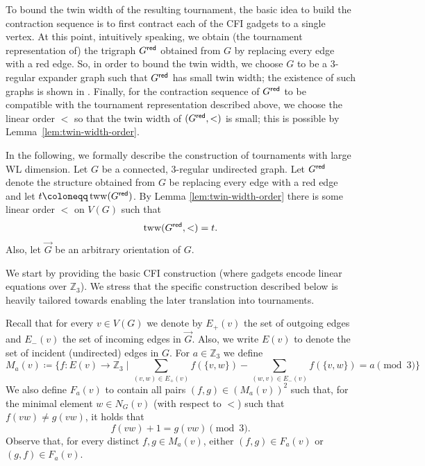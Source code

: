 \documentclass{theoretics}
\newcommand{\ZZ}{{\mathbb Z}}
\newcommand{\Bigmid}{\;\Big|\;}
\newcommand{\red}{{\sf red}}
\DeclareMathOperator{\tww}{tww}
\begin{document}
To bound the twin width of the resulting tournament, the basic idea to build the contraction sequence is to first contract each of the CFI gadgets to a single vertex.
At this point, intuitively speaking, we obtain (the tournament representation of) the trigraph $G^{\red}$ obtained from $G$ by replacing every edge with a red edge.
So, in order to bound the twin width, we choose $G$ to be a $3$-regular expander graph such that $G^{\red}$ has small twin width; the existence of such graphs is shown in \cite{BonnetGKTW22}.
Finally, for the contraction sequence of $G^{\red}$ to be compatible with the tournament representation described above, we choose the linear order $<$ so that the twin width of $(G^{\red},<)$ is small; this is possible by Lemma~\ref{lem:twin-width-order}.

In the following, we formally describe the construction of tournaments with large WL dimension.
Let $G$ be a connected, $3$-regular undirected graph.
Let $G^{\red}$ denote the structure obtained from $G$ be replacing every edge with a red edge and let $t \coloneqq \tww(G^{\red})$.
By Lemma \ref{lem:twin-width-order} there is some linear order $<$ on $V(G)$ such that
\begin{equation}
 \label{eq:order-twin-width}
 \tww(G^\red,<) = t.
\end{equation}
Also, let $\vec{G}$ be an arbitrary orientation of $G$.

We start by providing the basic CFI construction (where gadgets encode linear equations over $\ZZ_3$).
We stress that the specific construction described below is heavily tailored towards enabling the later translation into tournaments.

Recall that for every $v \in V(G)$ we denote by $E_+(v)$ the set of outgoing edges and $E_-(v)$ the set of incoming edges in $\vec{G}$.
Also, we write $E(v)$ to denote the set of incident (undirected) edges in $G$.
For $a \in \ZZ_3$ we define
\[M_a(v) \coloneqq \Big\{f\colon E(v) \to \ZZ_3 \Bigmid \sum_{(v,w) \in E_+(v)} f(\{v,w\}) - \sum_{(w,v) \in E_-(v)} f(\{v,w\}) = a \pmod{3}\Big\}\]
We also define $F_a(v)$ to contain all pairs $(f,g) \in (M_a(v))^2$ such that, for the minimal element $w \in N_G(v)$ (with respect to $<$) such that $f(vw) \neq g(vw)$, it holds that
\[f(vw) + 1 = g(vw) \pmod{3}.\]
Observe that, for every distinct $f,g \in M_a(v)$, either $(f,g) \in F_a(v)$ or $(g,f) \in F_a(v)$.
\end{document}
